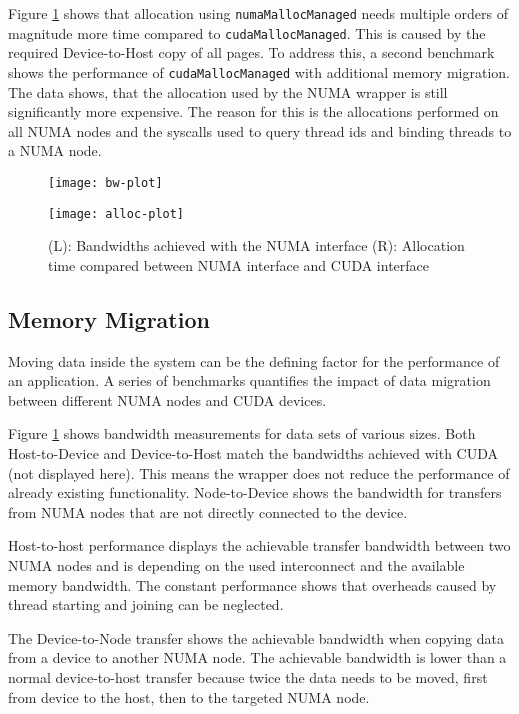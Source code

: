 Figure \ref{f:micro} shows that allocation using \verb|numaMallocManaged| needs multiple orders of magnitude more time compared
to \verb|cudaMallocManaged|. This is caused by the required Device-to-Host copy of all pages. To address this, a second benchmark shows the performance of \verb|cudaMallocManaged| with additional
memory migration. The data shows, that the allocation used by the NUMA wrapper is still significantly more expensive.
The reason for this is the allocations performed on all NUMA nodes and the syscalls used to query thread ids and binding threads to a 
NUMA node.
\begin{figure}[tp]
	\centering
	\begin{minipage}{0.5\textwidth}
		\centering
		\texttt{[image: bw-plot]}
	\end{minipage}\hfill
	\begin{minipage}{0.5\textwidth}
		\centering
		\texttt{[image: alloc-plot]}
	\end{minipage}
	\caption{(L): Bandwidths achieved with the NUMA interface \newline (R): Allocation time compared between NUMA interface and CUDA interface}
	\label{f:micro}
\end{figure}
\subsection{Memory Migration}
Moving data inside the system can be the defining factor for the performance of an application. A series
of benchmarks quantifies the impact of data migration between different NUMA nodes and CUDA devices.

Figure \ref{f:micro} shows bandwidth measurements for data sets of various sizes. Both Host-to-Device and Device-to-Host
match the bandwidths achieved with CUDA (not displayed here). This means the wrapper does not reduce the performance
of already existing functionality.
Node-to-Device shows the bandwidth for transfers from NUMA nodes that are not directly connected to the device.

Host-to-host performance displays the achievable transfer bandwidth between two NUMA nodes and is depending on the used interconnect and the available memory bandwidth. The constant
performance shows that overheads caused by thread starting and joining can be neglected.

The Device-to-Node transfer shows the achievable bandwidth when copying data from a device to another NUMA node.
The achievable bandwidth is lower than a normal device-to-host transfer because twice the data needs to be moved, first
from device to the host, then to the targeted NUMA node.


